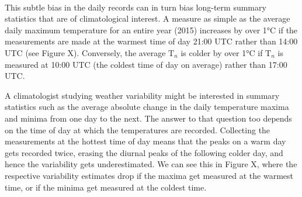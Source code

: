 \documentclass[letter]{article}
\newcommand{\Tn}{\mathrm{T}_{n}}
\begin{document}
    			
    \begin{figure}[tbh]
    \begin{center}
    \end{center}
    { \hspace*{\fill} \\}
	\end{figure}
    
    		
    	This subtle bias in the daily records can in turn bias long-term summary
statistics that are of climatological interest. A measure as simple as
the average daily maximum temperature for an entire year (2015)
increases by over 1°C if the measurements are made at the warmest time
of day 21:00 UTC rather than 14:00 UTC (see Figure X). Conversely, the
average \(\Tn\) is colder by over 1°C if \(\Tn\) is measured at 10:00
UTC (the coldest time of day on average) rather than 17:00 UTC.

A climatologist studying weather variability might be interested in
summary statistics such as the average absolute change in the daily
temperature maxima and minima from one day to the next. The answer to
that question too depends on the time of day at which the temperatures
are recorded. Collecting the measurements at the hottest time of day
means that the peaks on a warm day gets recorded twice, erasing the
diurnal peaks of the following colder day, and hence the variability
gets underestimated. We can see this in Figure X, where the respective
variability estimates drop if the maxima get measured at the warmest
time, or if the minima get measured at the coldest time.
    



    			
    \begin{figure}[tbh]
    \begin{center}
    \end{center}
    { \hspace*{\fill} \\}
	\end{figure}
    
    		

    			
    \begin{figure}[tbh]
    \begin{center}
    \end{center}
    { \hspace*{\fill} \\}
	\end{figure}
    
\end{document}
